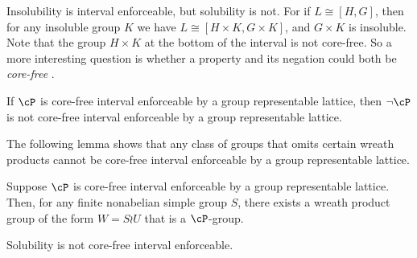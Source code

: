 \begin{frame}[label=IEPropsConjecture]{}
Insolubility is interval enforceable, but solubility is not. 
\vskip4mm
For if $L\cong [H, G]$, then for any insoluble 
group $K$ we have $L\cong [H\times K, G\times K]$, and $G\times K$ is
insoluble.  
\vskip4mm
Note that the group $H\times K$ at the bottom of
the interval is not core-free.  So a more interesting question is whether a
property and its negation could both be \emph{core-free} \IE.  
\vskip4mm
\begin{conjecture}
\label{conjecture:isle-prop2}
If $\cP$ is core-free interval enforceable by a group representable lattice,
then $\neg \cP$ is not core-free interval enforceable by a group representable lattice.
\end{conjecture}
\end{frame}

\begin{frame}[label=IEPropsLemma2]{}
The following lemma shows that 
any class of groups that omits certain wreath products cannot be core-free
interval enforceable by a group representable lattice. 
\vskip4mm
\begin{lemma}
Suppose $\cP$ is core-free interval enforceable by a group
representable lattice.   
Then, for any finite nonabelian simple group $S$, there exists a wreath product group
of the form $W = S\wr U$ that is a $\cP$-group. 
\end{lemma}
\vskip4mm
\begin{corollary}
Solubility is not core-free interval enforceable.
\end{corollary}
\end{frame}

